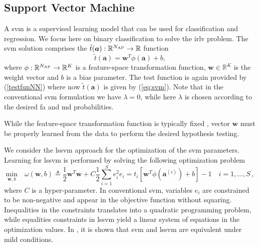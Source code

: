 \documentclass[draftcls,onecolumn,12pt]{IEEEtran}
\begin{document}
\subsection{Support Vector Machine}\label{sec:svm}
A \ac{svm} \underline{\cite[Chapter~7]{Bishop2006}} is a supervised learning model that can be used for classification and regression. We focus here on binary classification to solve the \ac{irlv} problem. The \ac{svm} solution comprises the $\tilde{t}(\bm{a}): \mathbb{R}^{N_{\rm AP}} \to \mathbb{R}$  function 
\begin{equation}
\label{eq:svm}
\tilde{t}(\bm{a}) = \bm{w}^T \phi (\bm{a}) + b,
\end{equation}
where $\phi: \mathbb{R}^{N_{\rm AP}} \to \mathbb{R}^K$ is a feature-space transformation function, $\bm{w} \in \mathbb{R}^K$ is the weight vector and $b$ is a bias parameter. The test function is again provided by (\ref{testfunNN}) where now $\tilde{t}(\bm{a})$ is given by (\ref{eq:svm}). Note that in the conventional \ac{svm} formulation we have $\lambda = 0$, while here $\lambda$ is chosen according to the desired \ac{fa} and \ac{md} probabilities.

While the feature-space transformation function is typically fixed \underline{\cite[Chapter~7]{Bishop2006}}, vector $\bm{w}$ must be properly learned from the data to perform the desired hypothesis testing. 

We consider the \ac{lssvm} approach \cite{Suykens1999} for the optimization of the \ac{svm} parameters.  Learning for \ac{lssvm} is performed by solving the following optimization problem
\begin{subequations}
	\label{eq:lssvm}
	\begin{equation}
	\label{eq:lssvmOrig}
	\underset{\bm{w},b }{\text{min}} \quad \omega(\bm{w},b) \triangleq \frac{1}{2} \bm{w}^T \bm{w} + C \frac{1}{2} \sum_{i=1}^S e_i ^2 
	\end{equation}
	\begin{equation}
	\label{eq:stpart}
	e_i =   t_i[\bm{w}^T \phi (\bm{a}^{(i)}) + b]-1   \quad i = 1 ,\dots,S\,,
	\end{equation}
\end{subequations}
where $C$ is a hyper-parameter. In conventional \ac{svm}, variables $e_i$ are constrained to be non-negative and appear in the objective function without squaring. Inequalities in the constraints translates into a quadratic programming problem, while equalities constraints in \ac{lssvm} yield a linear system of equations in the optimization values. In \cite{Yevs}, it is shown that \ac{svm} and \ac{lssvm} are equivalent under mild conditions.
\end{document}
